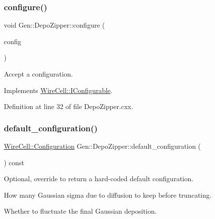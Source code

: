 \subsubsection{\texorpdfstring{configure()}{configure()}}
{\footnotesize\ttfamily void Gen\+::\+Depo\+Zipper\+::configure (\begin{DoxyParamCaption}\item[{const \hyperlink{namespace_wire_cell_a9f705541fc1d46c608b3d32c182333ee}{Wire\+Cell\+::\+Configuration} \&}]{config }\end{DoxyParamCaption})\hspace{0.3cm}{\ttfamily [virtual]}}



Accept a configuration. 



Implements \hyperlink{class_wire_cell_1_1_i_configurable_a57ff687923a724093df3de59c6ff237d}{Wire\+Cell\+::\+I\+Configurable}.



Definition at line 32 of file Depo\+Zipper.\+cxx.

\mbox{\label{class_wire_cell_1_1_gen_1_1_depo_zipper_aaecdc02da3fb1362266b4606cfe9e03f}} 
\subsubsection{\texorpdfstring{default\+\_\+configuration()}{default\_configuration()}}
{\footnotesize\ttfamily \hyperlink{namespace_wire_cell_a9f705541fc1d46c608b3d32c182333ee}{Wire\+Cell\+::\+Configuration} Gen\+::\+Depo\+Zipper\+::default\+\_\+configuration (\begin{DoxyParamCaption}{ }\end{DoxyParamCaption}) const\hspace{0.3cm}{\ttfamily [virtual]}}



Optional, override to return a hard-\/coded default configuration. 

How many Gaussian sigma due to diffusion to keep before truncating.

Whether to fluctuate the final Gaussian deposition.


